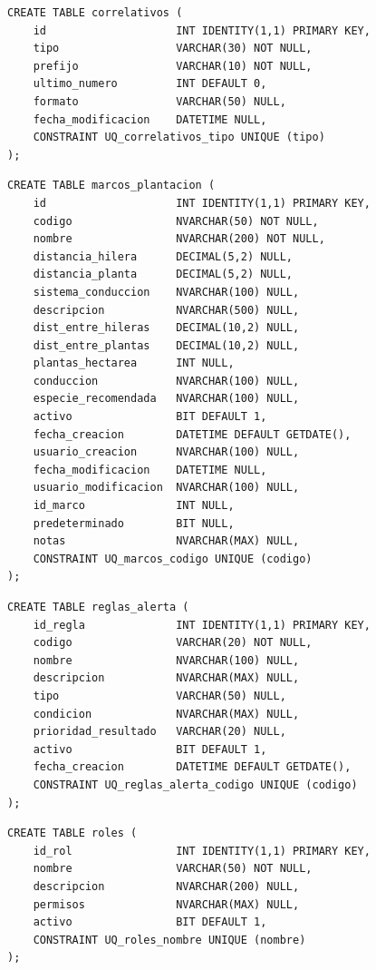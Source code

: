 \documentclass[12pt,a4paper,twoside]{report}
\begin{document}
\begin{lstlisting}[style=sqlstyle, caption={correlativos}]
CREATE TABLE correlativos (
    id                    INT IDENTITY(1,1) PRIMARY KEY,
    tipo                  VARCHAR(30) NOT NULL,
    prefijo               VARCHAR(10) NOT NULL,
    ultimo_numero         INT DEFAULT 0,
    formato               VARCHAR(50) NULL,
    fecha_modificacion    DATETIME NULL,
    CONSTRAINT UQ_correlativos_tipo UNIQUE (tipo)
);
\end{lstlisting}

\begin{lstlisting}[style=sqlstyle, caption={marcos\_plantacion}]
CREATE TABLE marcos_plantacion (
    id                    INT IDENTITY(1,1) PRIMARY KEY,
    codigo                NVARCHAR(50) NOT NULL,
    nombre                NVARCHAR(200) NOT NULL,
    distancia_hilera      DECIMAL(5,2) NULL,
    distancia_planta      DECIMAL(5,2) NULL,
    sistema_conduccion    NVARCHAR(100) NULL,
    descripcion           NVARCHAR(500) NULL,
    dist_entre_hileras    DECIMAL(10,2) NULL,
    dist_entre_plantas    DECIMAL(10,2) NULL,
    plantas_hectarea      INT NULL,
    conduccion            NVARCHAR(100) NULL,
    especie_recomendada   NVARCHAR(100) NULL,
    activo                BIT DEFAULT 1,
    fecha_creacion        DATETIME DEFAULT GETDATE(),
    usuario_creacion      NVARCHAR(100) NULL,
    fecha_modificacion    DATETIME NULL,
    usuario_modificacion  NVARCHAR(100) NULL,
    id_marco              INT NULL,
    predeterminado        BIT NULL,
    notas                 NVARCHAR(MAX) NULL,
    CONSTRAINT UQ_marcos_codigo UNIQUE (codigo)
);
\end{lstlisting}

\begin{lstlisting}[style=sqlstyle, caption={reglas\_alerta}]
CREATE TABLE reglas_alerta (
    id_regla              INT IDENTITY(1,1) PRIMARY KEY,
    codigo                VARCHAR(20) NOT NULL,
    nombre                NVARCHAR(100) NULL,
    descripcion           NVARCHAR(MAX) NULL,
    tipo                  VARCHAR(50) NULL,
    condicion             NVARCHAR(MAX) NULL,
    prioridad_resultado   VARCHAR(20) NULL,
    activo                BIT DEFAULT 1,
    fecha_creacion        DATETIME DEFAULT GETDATE(),
    CONSTRAINT UQ_reglas_alerta_codigo UNIQUE (codigo)
);
\end{lstlisting}

\begin{lstlisting}[style=sqlstyle, caption={roles}]
CREATE TABLE roles (
    id_rol                INT IDENTITY(1,1) PRIMARY KEY,
    nombre                VARCHAR(50) NOT NULL,
    descripcion           NVARCHAR(200) NULL,
    permisos              NVARCHAR(MAX) NULL,
    activo                BIT DEFAULT 1,
    CONSTRAINT UQ_roles_nombre UNIQUE (nombre)
);
\end{lstlisting}
\end{document}
